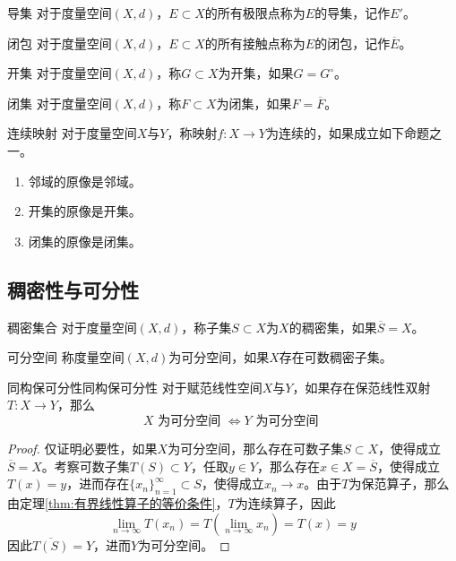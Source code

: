 \documentclass[lang = cn, scheme = chinese, thmcnt = section]{elegantbook}
\newcommand{\sub}{\subset}             %
\begin{document}
\begin{definition}{导集}
	对于度量空间$(X,d)$，$E\sub X$的所有极限点称为$E$的导集，记作$E'$。
\end{definition}

\begin{definition}{闭包}
	对于度量空间$(X,d)$，$E\sub X$的所有接触点称为$E$的闭包，记作$\overline{E}$。
\end{definition}

\begin{definition}{开集}
	对于度量空间$(X,d)$，称$G\sub X$为开集，如果$G=G^\circ$。
\end{definition}

\begin{definition}{闭集}
	对于度量空间$(X,d)$，称$F\sub X$为闭集，如果$F=\overline{F}$。
\end{definition}

\begin{definition}{连续映射}
	对于度量空间$X$与$Y$，称映射$f:X\to Y$为连续的，如果成立如下命题之一。
	\begin{enumerate}
		\item 邻域的原像是邻域。
		\item 开集的原像是开集。
		\item 闭集的原像是闭集。
	\end{enumerate}
\end{definition}

\subsection{稠密性与可分性}

\begin{definition}{稠密集合}
	对于度量空间$(X,d)$，称子集$S\sub X$为$X$的稠密集，如果$\overline{S}=X$。
\end{definition}

\begin{definition}{可分空间}
	称度量空间$( X,d )$为可分空间，如果$X$存在可数稠密子集。
\end{definition}

\begin{theorem}{同构保可分性}{同构保可分性}
	对于赋范线性空间$X$与$Y$，如果存在保范线性双射$T:X\to Y$，那么
	$$
	X\text{ 为可分空间 }
	\iff 
	Y\text{ 为可分空间 }
	$$
\end{theorem}

\begin{proof}
	仅证明必要性，如果$X$为可分空间，那么存在可数子集$S\sub X$，使得成立$\overline{S}=X$。考察可数子集$T(S)\sub Y$，任取$y\in Y$，那么存在$x\in X=\overline{S}$，使得成立$T(x)=y$，进而存在$\{x_n\}_{n=1}^{\infty}\sub S$，使得成立$x_n\to x$。由于$T$为保范算子，那么由定理\ref{thm:有界线性算子的等价条件}，$T$为连续算子，因此
	$$
	\lim_{n\to\infty} T(x_n)
	= T(\lim_{n\to\infty} x_n)
	= T(x)
	= y
	$$
	因此$\overline{T(S)}=Y$，进而$Y$为可分空间。
\end{proof}
\end{document}
